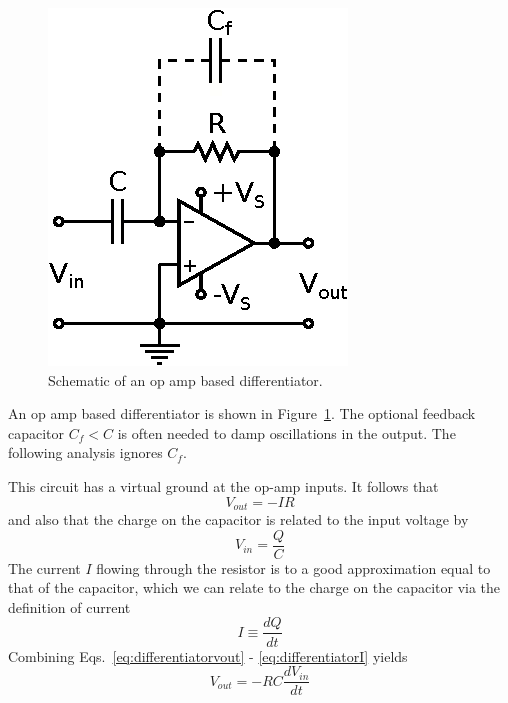 \documentclass[11pt]{article}
\begin{document}
\begin{figure}[h!]
  \begin{center}
    \includegraphics{differentiator.eps}
    \caption{Schematic of an op amp based differentiator.}
    \label{fig:differentiator}
  \end{center}
\end{figure}

An op amp based differentiator is shown in
Figure~\ref{fig:differentiator}. The optional feedback capacitor $C_f
< C$ is often needed to damp oscillations in the output. The following
analysis ignores $C_f$.

This circuit has a virtual ground at the op-amp inputs. It follows
that 
\begin{equation}
  \label{eq:differentiatorvout}
  V_{out} = - IR
\end{equation}
and also that the charge on the capacitor is related to the input
voltage by
\begin{equation}
  V_{in} = \frac{Q}{C}
\end{equation}
The current $I$ flowing through the resistor is to a good
approximation equal to that of the capacitor, which we can relate to
the charge on the capacitor via the definition of current
\begin{equation}
  \label{eq:differentiatorI}
  I \equiv \frac{dQ}{dt}
\end{equation}
Combining Eqs.~\ref{eq:differentiatorvout} - \ref{eq:differentiatorI}
yields 
\begin{equation}
  \label{eq:opampdiff}
  V_{out} = - RC \frac{d V_{in}}{dt}
\end{equation}
\end{document}
